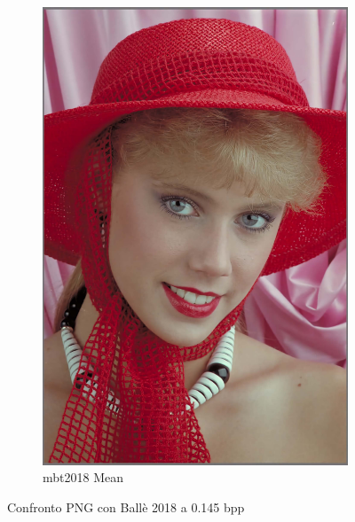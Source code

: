 \begin{figure}[t!]
\begin{subfigure}[]{0.25\textwidth}
        \includegraphics[width=\textwidth]{Immagini/IMAGES/mbt2018_mean_3_IMG0004.pdf}
        \caption{mbt2018 Mean}
        \label{fig:CompressedMbt2018Mean}
    \end{subfigure}
    \caption{Confronto PNG con Ballè 2018 a 0.145 bpp}
    \label{fig:CompressionMbt2018}
\end{figure}


